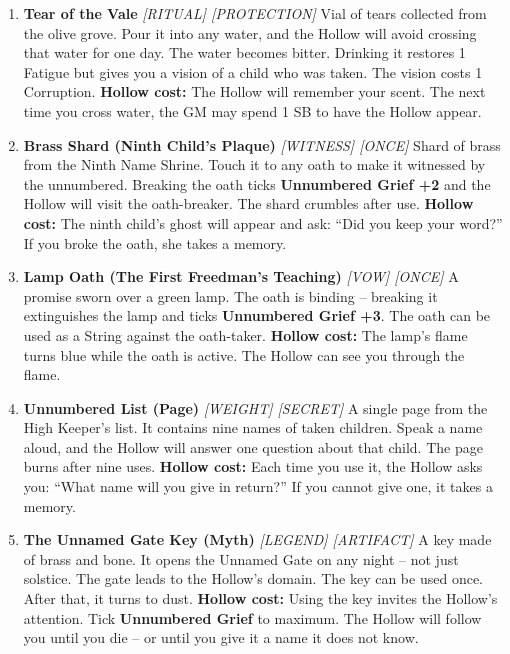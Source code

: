 \begin{enumerate}
\item \textbf{Tear of the Vale} \hfill \textit{[RITUAL] [PROTECTION]}  
  Vial of tears collected from the olive grove. Pour it into any water, and the Hollow will avoid crossing that water for one day. The water becomes bitter. Drinking it restores 1 Fatigue but gives you a vision of a child who was taken. The vision costs 1 Corruption.  
  \textbf{Hollow cost:} The Hollow will remember your scent. The next time you cross water, the GM may spend 1 SB to have the Hollow appear.

\item[J] \textbf{Brass Shard (Ninth Child's Plaque)} \hfill \textit{[WITNESS] [ONCE]}  
  Shard of brass from the Ninth Name Shrine. Touch it to any oath to make it witnessed by the unnumbered. Breaking the oath ticks \textbf{Unnumbered Grief +2} and the Hollow will visit the oath-breaker. The shard crumbles after use.  
  \textbf{Hollow cost:} The ninth child's ghost will appear and ask: ``Did you keep your word?'' If you broke the oath, she takes a memory.

\item[Q] \textbf{Lamp Oath (The First Freedman's Teaching)} \hfill \textit{[VOW] [ONCE]}  
  A promise sworn over a green lamp. The oath is binding -- breaking it extinguishes the lamp and ticks \textbf{Unnumbered Grief +3}. The oath can be used as a String against the oath-taker.  
  \textbf{Hollow cost:} The lamp's flame turns blue while the oath is active. The Hollow can see you through the flame.

\item[K] \textbf{Unnumbered List (Page)} \hfill \textit{[WEIGHT] [SECRET]}  
  A single page from the High Keeper's list. It contains nine names of taken children. Speak a name aloud, and the Hollow will answer one question about that child. The page burns after nine uses.  
  \textbf{Hollow cost:} Each time you use it, the Hollow asks you: ``What name will you give in return?'' If you cannot give one, it takes a memory.

\item[A] \textbf{The Unnamed Gate Key (Myth)} \hfill \textit{[LEGEND] [ARTIFACT]}  
  A key made of brass and bone. It opens the Unnamed Gate on any night -- not just solstice. The gate leads to the Hollow's domain. The key can be used once. After that, it turns to dust.  
  \textbf{Hollow cost:} Using the key invites the Hollow's attention. Tick \textbf{Unnumbered Grief} to maximum. The Hollow will follow you until you die -- or until you give it a name it does not know.
\end{enumerate}

